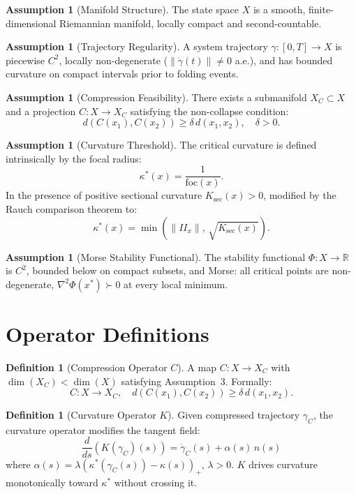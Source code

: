 \documentclass[11pt, twoside, openright]{book}
\theoremstyle{plain}
\theoremstyle{definition}
\newtheorem{definition}[theorem]{Definition}
\newtheorem{assumption}[theorem]{Assumption}
\begin{document}
\begin{assumption}[Manifold Structure]
The state space $X$ is a smooth, finite-dimensional Riemannian manifold,
locally compact and second-countable.
\end{assumption}

\begin{assumption}[Trajectory Regularity]
A system trajectory $\gamma : [0,T] \to X$ is piecewise $C^2$,
locally non-degenerate ($\|\dot\gamma(t)\| \neq 0$ a.e.), and has
bounded curvature on compact intervals prior to folding events.
\end{assumption}

\begin{assumption}[Compression Feasibility]
There exists a submanifold $X_C \subset X$ and a projection
$C : X \to X_C$ satisfying the non-collapse condition:
\[
d(C(x_1), C(x_2)) \ge \delta\, d(x_1, x_2), \quad \delta > 0.
\]
\end{assumption}

\begin{assumption}[Curvature Threshold]
The critical curvature is defined intrinsically by the focal radius:
\[
\kappa^*(x) = \frac{1}{\mathrm{foc}(x)}.
\]
In the presence of positive sectional curvature $K_{\sec}(x) > 0$,
modified by the Rauch comparison theorem to:
\[
\kappa^*(x) = \min\!\left(\|II_x\|,\, \sqrt{K_{\sec}(x)}\right).
\]
\end{assumption}

\begin{assumption}[Morse Stability Functional]
The stability functional $\Phi : X \to \mathbb{R}$ is $C^2$, bounded
below on compact subsets, and Morse: all critical points are
non-degenerate, $\nabla^2\Phi(x^*) \succ 0$ at every local minimum.
\end{assumption}

\section{Operator Definitions}

\begin{definition}[Compression Operator $C$]
A map $C : X \to X_C$ with $\dim(X_C) < \dim(X)$ satisfying
Assumption~3. Formally:
\[
C: X \to X_C, \quad d(C(x_1), C(x_2)) \ge \delta\, d(x_1, x_2).
\]
\end{definition}

\begin{definition}[Curvature Operator $K$]
Given compressed trajectory $\gamma_C$, the curvature operator
modifies the tangent field:
\[
\frac{d}{ds}(K(\gamma_C)(s)) = \dot\gamma_C(s) + \alpha(s)\,n(s)
\]
where $\alpha(s) = \lambda(\kappa^*(\gamma_C(s)) - \kappa(s))_+$,
$\lambda > 0$. $K$ drives curvature monotonically toward $\kappa^*$
without crossing it.
\end{definition}
\end{document}
